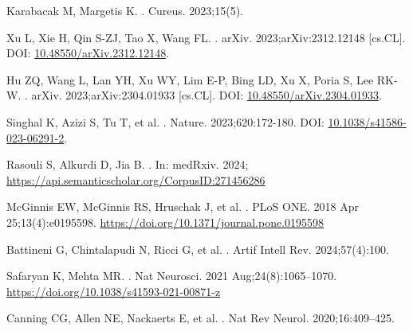\documentclass[10pt,letterpaper]{article}
\begin{document}
\begin{thebibliography}{10}
Karabacak M, Margetis K.
.
\newblock Cureus. 2023;15(5).

Xu L, Xie H, Qin S-ZJ, Tao X, Wang FL.
.
\newblock arXiv. 2023;arXiv:2312.12148 [cs.CL].
\newblock DOI: \href{https://doi.org/10.48550/arXiv.2312.12148}{10.48550/arXiv.2312.12148}.

Hu ZQ, Wang L, Lan YH, Xu WY, Lim E-P, Bing LD, Xu X, Poria S, Lee RK-W.
.
\newblock arXiv. 2023;arXiv:2304.01933 [cs.CL].
\newblock DOI: \href{https://doi.org/10.48550/arXiv.2304.01933}{10.48550/arXiv.2304.01933}.

Singhal K, Azizi S, Tu T, et al.
.
\newblock Nature. 2023;620:172-180.
\newblock DOI: \href{https://doi.org/10.1038/s41586-023-06291-2}{10.1038/s41586-023-06291-2}.

Rasouli S, Alkurdi D, Jia B.
.
\newblock In: medRxiv. 2024;
\url{https://api.semanticscholar.org/CorpusID:271456286} 

McGinnis EW, McGinnis RS, Hruschak J, et al.
.
\newblock PLoS ONE. 2018 Apr 25;13(4):e0195598. \url{https://doi.org/10.1371/journal.pone.0195598}

Battineni G, Chintalapudi N, Ricci G, et al.
.
\newblock Artif Intell Rev. 2024;57(4):100.

Safaryan K, Mehta MR.
.
\newblock Nat Neurosci. 2021 Aug;24(8):1065--1070. \url{https://doi.org/10.1038/s41593-021-00871-z}

Canning CG, Allen NE, Nackaerts E, et al.
.
\newblock Nat Rev Neurol. 2020;16:409--425.




\end{thebibliography}
\end{document}

